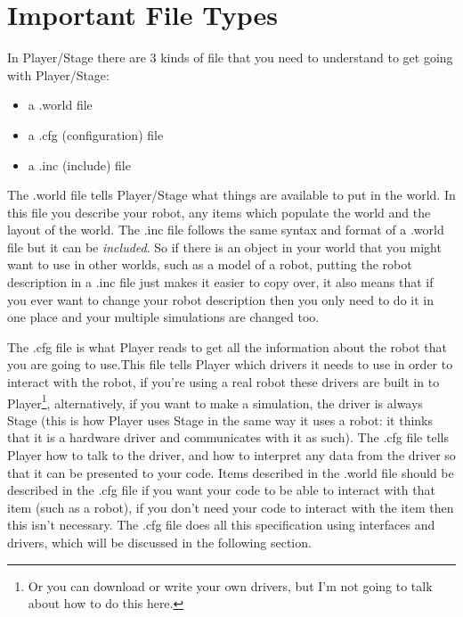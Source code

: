 \documentclass[a4paper]{report}
\newcommand{\plst}{Player/Stage\xspace}
\newcommand{\pl}{Player\xspace}
\begin{document}
\section{Important File Types}\label{sec:Basics:FileTypes}
In \plst there are 3 kinds of file that you need to understand to get going with \plst:
\begin{itemize}
	\item a .world file
	\item a .cfg (configuration) file
	\item a .inc (include) file
\end{itemize}
The .world file tells \plst what things are available to put in the world. In this file you describe your robot, any items which populate the world and the layout of the world. The .inc file follows the same syntax and format of a .world file but it can be \emph{included}. So if there is an object in your world that you might want to use in other worlds, such as a model of a robot, putting the robot description in a .inc file just makes it easier to copy over, it also means that if you ever want to change your robot description then you only need to do it in one place and your multiple simulations are changed too.

The .cfg file is what \pl reads to get all the information about the robot that you are going to use.This file tells \pl which drivers it needs to use in order to interact with the robot, if you're using a real robot these drivers are built in to \pl\footnote{Or you can download or write your own drivers, but I'm not going to talk about how to do this here.}, alternatively, if you want to make a simulation, the driver is always Stage (this is how \pl uses Stage in the same way it uses a robot: it thinks that it is a hardware driver and communicates with it as such). The .cfg file tells \pl how to talk to the driver, and how to interpret any data from the driver so that it can be presented to your code. Items described in the .world file should be described in the .cfg file if you want your code to be able to interact with that item (such as a robot), if you don't need your code to interact with the item then this isn't necessary. The .cfg file does all this specification using interfaces and drivers, which will be discussed in the following section.
\end{document}
